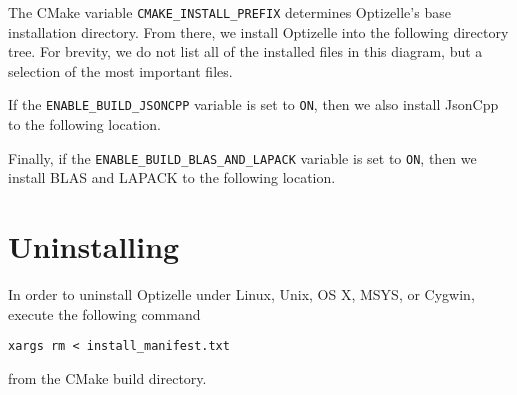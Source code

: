 \documentclass{report}
\makeatletter
\newcommand{\textct}{\begingroup\@activeus\@textct}
\newcommand*{\@textct}[1]{\texttt{#1}\endgroup}
\makeatother
\begin{document}
    The CMake variable \textct{CMAKE_INSTALL_PREFIX} determines Optizelle's base installation directory.  From there, we install Optizelle into the following directory tree.  For brevity, we do not list all of the installed files in this diagram, but a selection of the most important files.
\begin{center}\begin{minipage}[t]{1\columnwidth}
\end{minipage}\end{center}
\label{lnk:jsoncppinstall}
If the \textct{ENABLE_BUILD_JSONCPP} variable is set to \textct{ON}, then we also install JsonCpp to the following location.
\begin{center}\begin{minipage}[t]{1\columnwidth}
\end{minipage}\end{center}
\label{lnk:lapackinstall}
Finally, if the \textct{ENABLE_BUILD_BLAS_AND_LAPACK} variable is set to \textct{ON}, then we install BLAS and LAPACK to the following location.
\begin{center}\begin{minipage}[t]{1\columnwidth}
\end{minipage}\end{center}

\section{Uninstalling}

        In order to uninstall Optizelle under Linux, Unix, OS X, MSYS, or Cygwin, execute the following command
\begin{center}
    \textct{xargs rm < install_manifest.txt}
\end{center}
from the CMake build directory. 
\end{document}
